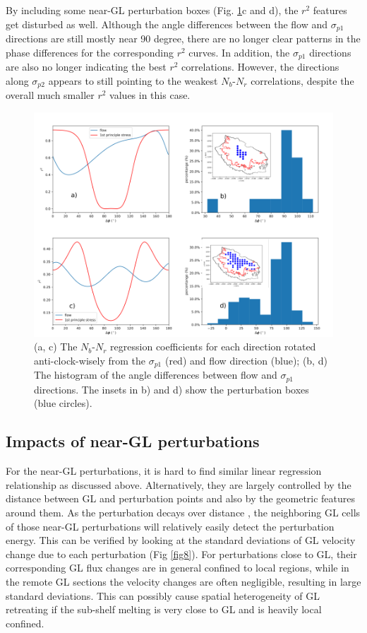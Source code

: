 \documentclass[review,oneside]{igs}
\begin{document}
By including some near-GL perturbation boxes (Fig. \ref{fig7}c and d), the $r^2$ features get disturbed as well. Although the angle differences between the flow and $\sigma_{p1}$ directions are still mostly near 90 degree, there are no longer clear patterns in the phase differences for the corresponding $r^2$ curves. In addition, the $\sigma_{p1}$ directions are also no longer indicating the best $r^2$ correlations. However, the directions along $\sigma_{p2}$ appears to still pointing to the weakest $N_b$-$N_r$ correlations, despite the overall much smaller $r^2$ values in this case.

\begin{figure}
	\centering
    \includegraphics[width=1\linewidth]{figs/fig7_new.pdf}
    \caption{(a, c) The $N_b$-$N_r$ regression coefficients for each direction rotated anti-clock-wisely from the $\sigma_{p1}$ (red) and flow direction (blue); (b, d) The histogram of the angle differences between flow and $\sigma_{p1}$ directions. The insets in b) and d) show the perturbation boxes (blue circles).}
	\label{fig7}
\end{figure}

\subsection{Impacts of near-GL perturbations}
For the near-GL perturbations, it is hard to find similar linear regression relationship as discussed above. Alternatively, they are largely controlled by the distance between GL and perturbation points and also by the geometric features around them. As the perturbation decays over distance \citep{lick1970}, the neighboring GL cells of those near-GL perturbations will relatively easily detect the perturbation energy. This can be verified by looking at the standard deviations of GL velocity change due to each perturbation (Fig \ref{fig8}). For perturbations close to GL, their corresponding GL flux changes are in general confined to local regions, while in the remote GL sections the velocity changes are often negligible, resulting in large standard deviations. This can possibly cause spatial heterogeneity of GL retreating if the sub-shelf melting is very close to GL and is heavily local confined. 
\end{document}
